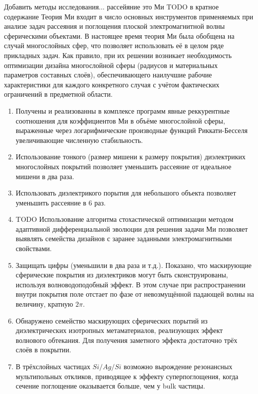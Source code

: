 
Добавить методы исследования... рассейяние это Ми TODO в кратное
содержание Теория Ми входит в число основных инструментов применяемых
при анализе задач рассеяния и поглощения плоской электромагнитной
волны сферическими объектами.  В настоящее время теория Ми была
обобщена на случай многослойных сфер, что позволяет использовать её в
целом ряде прикладных задач.  Как правило, при их решении возникает
необходимость оптимизации дизайна многослойной сферы (радиусов и
материальных параметров составных слоёв), обеспечивающего наилучшие
рабочие характеристики для каждого конкретного случая с учётом
фактических ограничений в предметной области.


\begin{enumerate}
  \item Получены и реализованны в комплексе программ явные
    реккурентные соотношения для коэффициентов Ми в объёме
    многослойной сферы, выраженные через логарифмические производные
    функций Риккати-Бесселя увеличивающие численную стабильность.  
  
  \item Использование тонкого (размер мишени к размеру покрытия) диэлектриких многослойных покрытий позволяет
    уменьшить рассеяние от идеальное мишени в два раза.
  \item Использовать диэлектрикого порытия для небольшого объекта
    позволяет уменьшить рассеяние в 6 раз.

  \item TODO Использование алгоритма стохастической оптимизации методом
    адаптивной дифференциальной эволюции для решения задачи Ми
    позволяет выявлять семейства дизайнов с заранее заданными
    электромагнитными свойствами.

  \item Защищать цифры (уменьшили в два раза и т.д.). Показано, что
    маскирующие сферические покрытия из диэлектриков могут быть
    сконструированы, используя волноводоподобный эффект.  В этом
    случае при распространении внутри покрытия поле отстает по фазе от
    невозмущённой падающей волны на величину, кратную $2\pi$.
  \item Обнаружено семейство маскирующих сферических порытий из
    диэлектрических изотропных метаматериалов, реализующих эффект
    волнового обтекания.  Для получения заметного эффекта достаточно
    трёх слоёв в покрытии.
  \item В трёхслойных частицах $Si/Ag/Si$ возможно вырождение
    резонансных мультипольных откликов, приводящее к эффекту
    суперпоглощения, когда сечение поглощение оказывается больше, чем
    у bulk частицы. 
  \end{enumerate}

